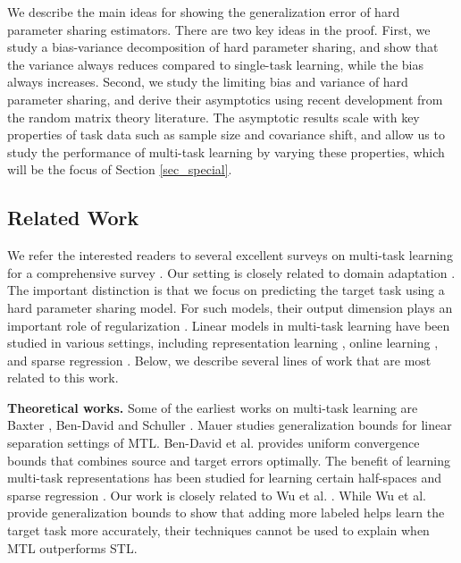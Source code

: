 We describe the main ideas for showing the generalization error of hard parameter sharing estimators.
There are two key ideas in the proof.
First, we study a bias-variance decomposition of hard parameter sharing, and show that the variance always reduces compared to single-task learning, while the bias always increases.
Second, we study the limiting bias and variance of hard parameter sharing, and derive their asymptotics using recent development from the random matrix theory literature.
The asymptotic results scale with key properties of task data such as sample size and covariance shift, and allow us to study the performance of multi-task learning by varying these properties, which will be the focus of Section \ref{sec_special}.





\subsection{Related Work}

We refer the interested readers to several excellent surveys on multi-task  learning for a comprehensive survey \cite{PY09,R17,ZY17,V20}.
Our setting is closely related to domain adaptation \cite{DM06,BB07,BC08,DH09,MMR09,CWB11,ZS13,NB17,ZD19}.
The important distinction is that we focus on predicting the target task using a hard parameter sharing model.
For such models, their output dimension plays an important role of regularization \cite{KD12}.
Linear models in multi-task learning have been studied in various settings, including representation learning \cite{BHKL19}, online learning \cite{CCG10,DCSP18}, and sparse regression \cite{LPVT11}.
Below, we describe several lines of work that are most related to this work.

\medskip
\noindent\textbf{Theoretical works.}
Some of the earliest works on multi-task learning are Baxter \cite{B00}, Ben-David and Schuller \cite{BS03}.
Mauer \cite{M06} studies generalization bounds for linear separation settings of MTL.
Ben-David et al. \cite{BBCK10} provides uniform convergence bounds that combines source and target errors optimally.
The benefit of learning multi-task representations has been studied for learning certain half-spaces \cite{MPR16} and sparse regression \cite{LPTV09,LPVT11}.
Our work is closely related to Wu et al. \cite{WZR20}.
While Wu et al. provide generalization bounds to show that adding more labeled helps learn the target task more accurately, their techniques cannot be used to explain when MTL outperforms STL.

